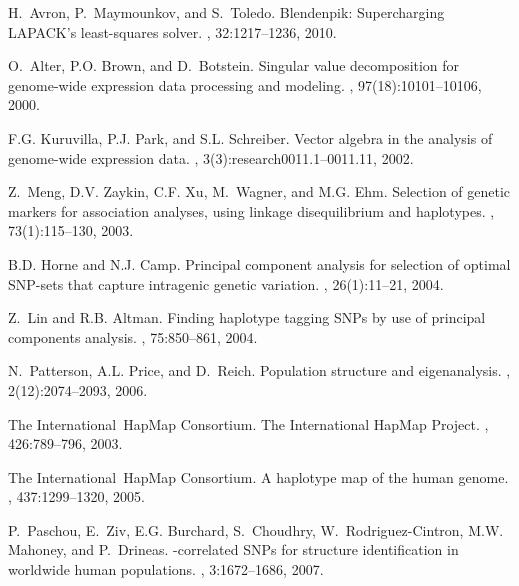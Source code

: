 \documentclass[twoside]{article}
\begin{document}
\begin{small}
\begin{thebibliography}{100}

H.~Avron, P.~Maymounkov, and S.~Toledo.
\newblock Blendenpik: Supercharging {LAPACK}'s least-squares solver.
, 32:1217--1236, 2010.

O.~Alter, P.O. Brown, and D.~Botstein.
\newblock Singular value decomposition for genome-wide expression data
  processing and modeling.
, 97(18):10101--10106, 2000.

F.G. Kuruvilla, P.J. Park, and S.L. Schreiber.
\newblock Vector algebra in the analysis of genome-wide expression data.
, 3(3):research0011.1--0011.11, 2002.

Z.~Meng, D.V. Zaykin, C.F. Xu, M.~Wagner, and M.G. Ehm.
\newblock Selection of genetic markers for association analyses, using linkage
  disequilibrium and haplotypes.
, 73(1):115--130, 2003.

B.D. Horne and N.J. Camp.
\newblock Principal component analysis for selection of optimal {SNP}-sets that
  capture intragenic genetic variation.
, 26(1):11--21, 2004.

Z.~Lin and R.B. Altman.
\newblock Finding haplotype tagging {SNPs} by use of principal components
  analysis.
, 75:850--861, 2004.

N.~Patterson, A.L. Price, and D.~Reich.
\newblock Population structure and eigenanalysis.
, 2(12):2074--2093, 2006.

The International~HapMap Consortium.
\newblock The {I}nternational {HapMap} {P}roject.
, 426:789--796, 2003.

The International~HapMap Consortium.
\newblock A haplotype map of the human genome.
, 437:1299--1320, 2005.

P.~Paschou, E.~Ziv, E.G. Burchard, S.~Choudhry, W.~Rodriguez-Cintron, M.W.
  Mahoney, and P.~Drineas.
-correlated {SNP}s for structure identification in worldwide
  human populations.
, 3:1672--1686, 2007.


\end{thebibliography}
\end{small}
\end{document}
